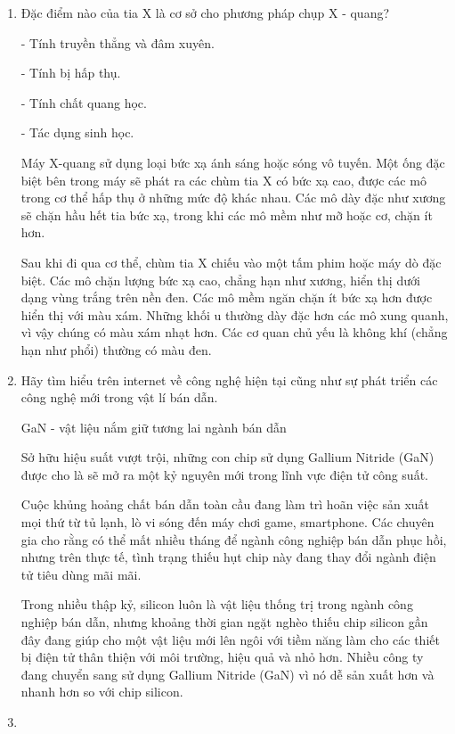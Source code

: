 \begin{enumerate}[label=\bfseries Câu \arabic*:]
{		- Nhờ tính nhạy sáng và nhiệt độ của vật kiệu bán dẫn, người ta có thể chế tạo các thiết bị cảm biến dùng trong các hệ thống điều khiển tự động.
		
	}
	\item {}
	
	
	{
		Đặc điểm nào của tia X là cơ sở cho phương pháp chụp X - quang?
	}
	
	\hideall
	{
		- Tính truyền thẳng và đâm xuyên.
		
		- Tính bị hấp thụ.
		
		- Tính chất quang học.
		
		- Tác dụng sinh học.
		
		Máy X-quang sử dụng loại bức xạ ánh sáng hoặc sóng vô tuyến. Một ống đặc biệt bên trong máy sẽ phát ra các chùm tia X có bức xạ cao, được các mô trong cơ thể hấp thụ ở những mức độ khác nhau. Các mô dày đặc như xương sẽ chặn hầu hết tia bức xạ, trong khi các mô mềm như mỡ hoặc cơ, chặn ít hơn.
		
		Sau khi đi qua cơ thể, chùm tia X chiếu vào một tấm phim hoặc máy dò đặc biệt. Các mô chặn lượng bức xạ cao, chẳng hạn như xương, hiển thị dưới dạng vùng trắng trên nền đen. Các mô mềm ngăn chặn ít bức xạ hơn được hiển thị với màu xám. Những khối u thường dày đặc hơn các mô xung quanh, vì vậy chúng có màu xám nhạt hơn. Các cơ quan chủ yếu là không khí (chẳng hạn như phổi) thường có màu đen.
	}
	\item {}
	
	
	{
		Hãy tìm hiểu trên internet về công nghệ hiện tại cũng như sự phát triển các công nghệ mới trong vật lí bán dẫn.
	}
	
	\hideall
	{
		GaN - vật liệu nắm giữ tương lai ngành bán dẫn
		
		Sở hữu hiệu suất vượt trội, những con chip sử dụng Gallium Nitride (GaN) được cho là sẽ mở ra một kỷ nguyên mới trong lĩnh vực điện tử công suất.
		
		Cuộc khủng hoảng chất bán dẫn toàn cầu đang làm trì hoãn việc sản xuất mọi thứ từ tủ lạnh, lò vi sóng đến máy chơi game, smartphone. Các chuyên gia cho rằng có thể mất nhiều tháng để ngành công nghiệp bán dẫn phục hồi, nhưng trên thực tế, tình trạng thiếu hụt chip này đang thay đổi ngành điện tử tiêu dùng mãi mãi.
		
		Trong nhiều thập kỷ, silicon luôn là vật liệu thống trị trong ngành công nghiệp bán dẫn, nhưng khoảng thời gian ngặt nghèo thiếu chip silicon gần đây đang giúp cho một vật liệu mới lên ngôi với tiềm năng làm cho các thiết bị điện tử thân thiện với môi trường, hiệu quả và nhỏ hơn. Nhiều công ty đang chuyển sang sử dụng Gallium Nitride (GaN) vì nó dễ sản xuất hơn và nhanh hơn so với chip silicon.
	}
	\item {}
	

\end{enumerate}
